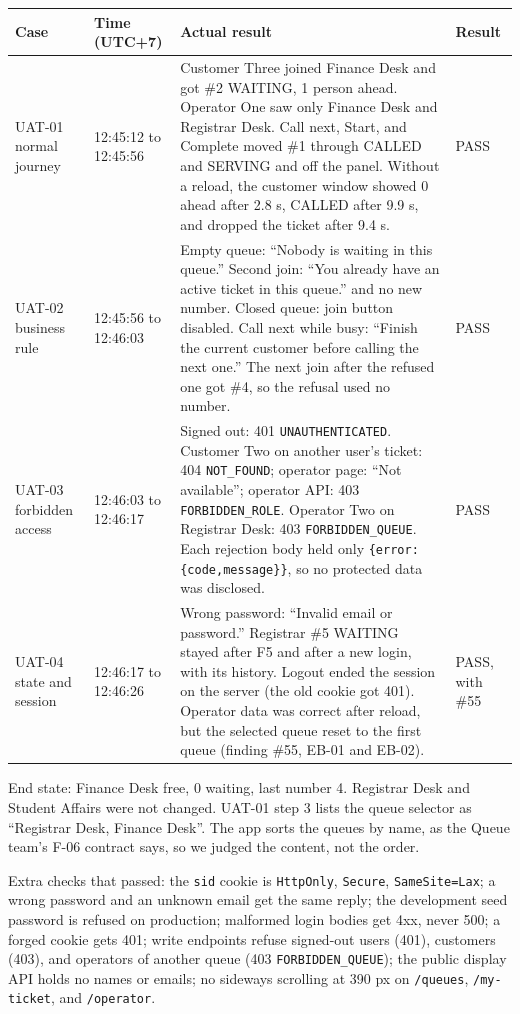 \begin{longtable}{@{}R{1.3cm}R{2.3cm}R{10.4cm}R{1.6cm}@{}}
\toprule \textbf{Case} & \textbf{Time (UTC+7)} & \textbf{Actual result} & \textbf{Result} \\ \midrule \endhead
UAT-01 normal journey & 12:45:12 to 12:45:56 & Customer Three joined Finance Desk and got \#2 WAITING, 1 person ahead. Operator One saw only Finance Desk and Registrar Desk. Call next, Start, and Complete moved \#1 through CALLED and SERVING and off the panel. Without a reload, the customer window showed 0 ahead after 2.8 s, CALLED after 9.9 s, and dropped the ticket after 9.4 s. & PASS \\
UAT-02 business rule & 12:45:56 to 12:46:03 & Empty queue: ``Nobody is waiting in this queue.'' Second join: ``You already have an active ticket in this queue.'' and no new number. Closed queue: join button disabled. Call next while busy: ``Finish the current customer before calling the next one.'' The next join after the refused one got \#4, so the refusal used no number. & PASS \\
UAT-03 forbidden access & 12:46:03 to 12:46:17 & Signed out: 401 \texttt{UNAUTHENTICATED}. Customer Two on another user's ticket: 404 \texttt{NOT\_FOUND}; operator page: ``Not available''; operator API: 403 \texttt{FORBIDDEN\_ROLE}. Operator Two on Registrar Desk: 403 \texttt{FORBIDDEN\_QUEUE}. Each rejection body held only \texttt{\{error:\{code,message\}\}}, so no protected data was disclosed. & PASS \\
UAT-04 state and session & 12:46:17 to 12:46:26 & Wrong password: ``Invalid email or password.'' Registrar \#5 WAITING stayed after F5 and after a new login, with its history. Logout ended the session on the server (the old cookie got 401). Operator data was correct after reload, but the selected queue reset to the first queue (finding \#55, EB-01 and EB-02). & PASS, with \#55 \\
\bottomrule
\end{longtable}

End state: Finance Desk free, 0 waiting, last number 4. Registrar Desk and Student Affairs were not changed.
UAT-01 step 3 lists the queue selector as ``Registrar Desk, Finance Desk''. The app sorts the queues by name, as the Queue team's F-06 contract says, so we judged the content, not the order.

Extra checks that passed: the \texttt{sid} cookie is \texttt{HttpOnly}, \texttt{Secure}, \texttt{SameSite=Lax}; a wrong password and an unknown email get the same reply; the development seed password is refused on production; malformed login bodies get 4xx, never 500; a forged cookie gets 401; write endpoints refuse signed-out users (401), customers (403), and operators of another queue (403 \texttt{FORBIDDEN\_QUEUE}); the public display API holds no names or emails; no sideways scrolling at 390 px on \texttt{/queues}, \texttt{/my-ticket}, and \texttt{/operator}.

